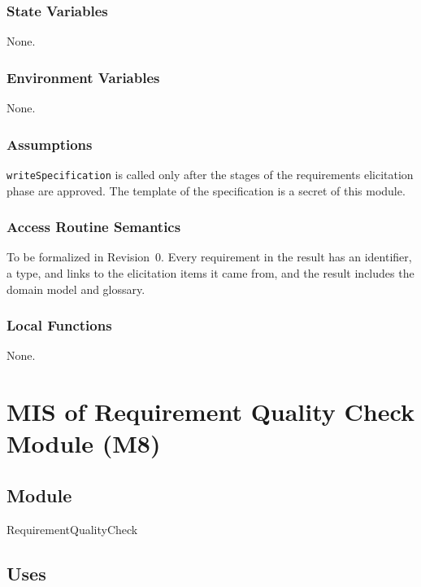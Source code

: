 \documentclass[12pt, titlepage]{article}
\begin{document}
\subsubsection{State Variables}

None.

\subsubsection{Environment Variables}

None.

\subsubsection{Assumptions}

\texttt{writeSpecification} is called only after the stages of the
requirements elicitation phase are approved. The template of the specification
is a secret of this module.

\subsubsection{Access Routine Semantics}

To be formalized in Revision~0. Every requirement in the result has an
identifier, a type, and links to the elicitation items it came from, and the
result includes the domain model and glossary.

\subsubsection{Local Functions}

None.

\newpage
\section{MIS of Requirement Quality Check Module (M8)} \label{MISQuality}

\subsection{Module}

RequirementQualityCheck

\subsection{Uses}
\end{document}
